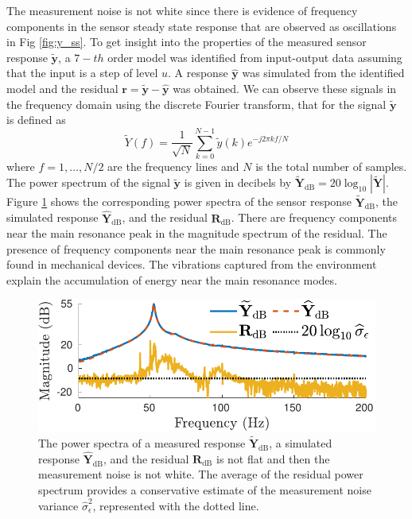 The measurement noise is not white since there is evidence of frequency components in the sensor steady state response that are observed as oscillations in Fig \ref{fig:y_ss}.
To get insight into the properties of the measured sensor response $\widetilde{\mathbf{y}}$, a $\mathrm{7-}th$ order model was identified from input-output data assuming that the input is a step of level $u$.
A response $\widehat{\mathbf{y}}$ was simulated from the identified model and the residual $\mathbf{r} = \widetilde{\mathbf{y}} - \widehat{\mathbf{y}}$ was obtained. 
We can observe these signals in the frequency domain using the discrete Fourier transform, that for the signal $\widetilde{\mathbf{y}}$ is defined as 
\begin{equation} \widetilde{Y}(f) = \dfrac{1}{\sqrt{N}} \sum_{k=0}^{N-1} \widetilde{y} \left( k \right) e^{-j2\pi k f / N} \label{eqn:FFT} \end{equation}
where $f = 1, \ldots, N/2$ are the frequency lines and $N$ is the total number of samples.
The power spectrum of the signal $\widetilde{\mathbf{y}}$ is given in decibels by $\widetilde{\mathbf{Y}}_\mathrm{dB} = 20 \log_{10}{ |\widetilde{\mathbf{Y}}| } $.
Figure \ref{fig:YYhR_n7} shows the corresponding power spectra of the sensor response $\widetilde{\mathbf{Y}}_\mathrm{dB}$, the simulated response $\widehat{\mathbf{Y}}_\mathrm{dB}$, and the residual $\mathbf{R}_\mathrm{dB}$. 
There are frequency components near the main resonance peak in the magnitude spectrum of the residual.
The presence of frequency components near the main resonance peak is commonly found in mechanical devices.
The vibrations captured from the environment explain the accumulation of energy near the main resonance modes.

\begin{figure}[!htb]
\centering
\includegraphics[width=1.0\columnwidth]{./ChapterExperimentalValidation/fig/Fig_9.pdf}
\caption{ \label{fig:YYhR_n7} 
The power spectra of a measured response $\widetilde{\mathbf{Y}}_\mathrm{dB}$, a simulated response $\widehat{\mathbf{Y}}_\mathrm{dB}$, and the residual $\mathbf{R}_\mathrm{dB}$ is not flat and then the measurement noise is not white. 
The average of the residual power spectrum provides a conservative estimate of the measurement noise variance $\widehat{\sigma}_\epsilon^2$, represented with the dotted line.}
\end{figure}

